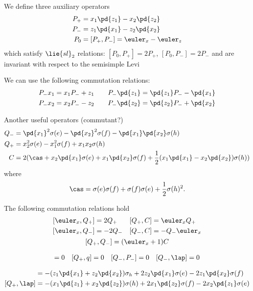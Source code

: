 We define three auxiliary operators
\begin{align}
    P_+ & = x_1 \pd{z_1} - x_2 \pd{z_2} \\
    P_- & = z_1 \pd{x_1} - z_2 \pd{x_2} \\
    P_0 & = [P_+, P_-] = \euler_x - \euler_z
\end{align}
which satisfy $\lie{sl}_2$ relations: $[P_0, P_+] = 2P_+$, $[P_0, P_-] = 2P_-$ and are invariant with respect to the semisimple Levi %

We can use the following commutation relations:
\begin{align}
P_- x_1 & = x_1 P_- + z_1 & \quad P_- \pd{z_1} = \pd{z_1} P_- - \pd{x_1} \\
P_- x_2 & = x_2 P_- - z_2 & \quad P_- \pd{z_2} = \pd{z_2} P_- + \pd{x_2}
\end{align}

Another useful operators (commutant?)
\begin{align}
Q_- &= \pd{x_1}^2 \sigma(e) - \pd{x_2}^2 \sigma(f) - \pd{x_1}\pd{x_2} \sigma(h) \\
Q_+ &= x_2^2 \sigma(e) - x_1^2 \sigma(f) + x_1 x_2 \sigma(h) \\
C &= 2(\cas + x_2\pd{x_1} \sigma(e) + x_1\pd{x_2}\sigma(f) + \frac{1}{2}(x_1\pd{x_1} - x_2\pd{x_2})\sigma(h))
\end{align}
where
\begin{equation}
\cas = \sigma(e)\sigma(f) + \sigma(f)\sigma(e) + \frac{1}{2} \sigma(h)^2.
\end{equation}

The following commutation relations hold
\begin{gather}
    \begin{align}
        [\euler_x, Q_+] &= 2Q_+    &  [Q_+, C] &= \euler_x Q_+  \\
        [\euler_x, Q_-] &= -2Q_-   &  [Q_-, C] &= -Q_- \euler_x
    \end{align}\\
    [Q_+, Q_-] = (\euler_x + 1) C
\end{gather}

\begin{align}
[Q_+, P_+] = 0 \quad [Q_+, q] = 0 \quad [Q_-, P_-] = 0 \quad [Q_-, \lap] = 0
\end{align}

\begin{align}
    [Q_-, q] &= - (z_1\pd{x_1}+z_2\pd{x_2})\sigma_h + 2z_2\pd{x_1}\sigma(e) - 2z_1\pd{x_2}\sigma(f)  \\
    [Q_+, \lap] &= -(x_1\pd{z_1} + x_2\pd{z_2}) \sigma(h) + 2x_1\pd{z_2}\sigma(f) - 2x_2\pd{z_1}\sigma(e)
\end{align}

